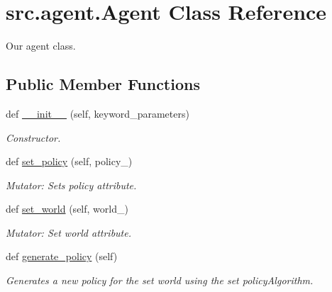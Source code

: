 \hypertarget{classsrc_1_1agent_1_1_agent}{}\section{src.\+agent.\+Agent Class Reference}
\label{classsrc_1_1agent_1_1_agent}


Our agent class.  


\subsection*{Public Member Functions}
\begin{DoxyCompactItemize}
\item 
def \hyperlink{classsrc_1_1agent_1_1_agent_a86883ad8e273a62d61634e0ecbdcf1ed}{\+\_\+\+\_\+init\+\_\+\+\_\+} (self, keyword\+\_\+parameters)
\begin{DoxyCompactList}\small\item\em Constructor. \end{DoxyCompactList}\item 
\mbox{\label{classsrc_1_1agent_1_1_agent_a40e0b7be81cba0248f4b6273d357eb27}} 
def \hyperlink{classsrc_1_1agent_1_1_agent_a40e0b7be81cba0248f4b6273d357eb27}{set\+\_\+policy} (self, policy\+\_\+)
\begin{DoxyCompactList}\small\item\em Mutator\+: Sets policy attribute. \end{DoxyCompactList}\item 
def \hyperlink{classsrc_1_1agent_1_1_agent_a5c84bc253f7ae188d87a839dbe73773a}{set\+\_\+world} (self, world\+\_\+)
\begin{DoxyCompactList}\small\item\em Mutator\+: Set world attribute. \end{DoxyCompactList}\item 
\mbox{\label{classsrc_1_1agent_1_1_agent_a457f7aa0476eba4665e73070c6a2c2e8}} 
def \hyperlink{classsrc_1_1agent_1_1_agent_a457f7aa0476eba4665e73070c6a2c2e8}{generate\+\_\+policy} (self)
\begin{DoxyCompactList}\small\item\em Generates a new policy for the set world using the set policy\+Algorithm. \end{DoxyCompactList}\end{DoxyCompactItemize}
